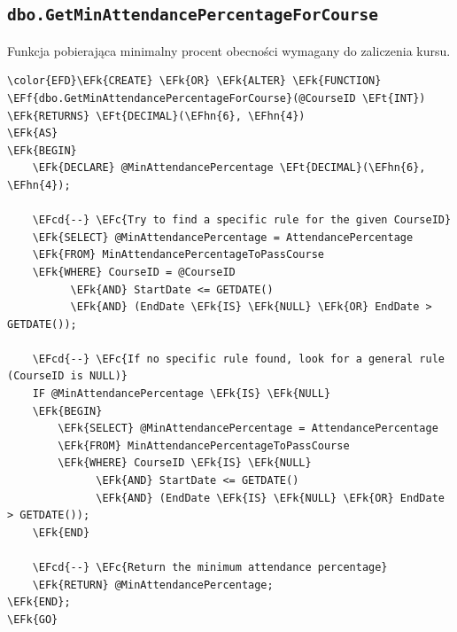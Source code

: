 \documentclass[11pt]{article}
\newcommand{\EFc}[1]{\textcolor{EFc}{\textit{#1}}} %
\newcommand{\EFcd}[1]{\textcolor{EFcd}{\textit{#1}}} %
\newcommand{\EFk}[1]{\textcolor{EFk}{\textbf{#1}}} %
\newcommand{\EFf}[1]{\textcolor{EFf}{#1}} %
\newcommand{\EFt}[1]{\textcolor{EFt}{\textbf{#1}}} %
\newcommand{\EFhn}[1]{\textcolor{EFhn}{#1}} %
\begin{document}
\subsection{\texttt{dbo.GetMinAttendancePercentageForCourse}}
\label{sec:orgd397634}
Funkcja pobierająca minimalny procent obecności wymagany do zaliczenia kursu.
\begin{Code}
\begin{Verbatim}
\color{EFD}\EFk{CREATE} \EFk{OR} \EFk{ALTER} \EFk{FUNCTION} \EFf{dbo.GetMinAttendancePercentageForCourse}(@CourseID \EFt{INT})
\EFk{RETURNS} \EFt{DECIMAL}(\EFhn{6}, \EFhn{4})
\EFk{AS}
\EFk{BEGIN}
    \EFk{DECLARE} @MinAttendancePercentage \EFt{DECIMAL}(\EFhn{6}, \EFhn{4});

    \EFcd{--} \EFc{Try to find a specific rule for the given CourseID}
    \EFk{SELECT} @MinAttendancePercentage = AttendancePercentage
    \EFk{FROM} MinAttendancePercentageToPassCourse
    \EFk{WHERE} CourseID = @CourseID
          \EFk{AND} StartDate <= GETDATE()
          \EFk{AND} (EndDate \EFk{IS} \EFk{NULL} \EFk{OR} EndDate > GETDATE());

    \EFcd{--} \EFc{If no specific rule found, look for a general rule (CourseID is NULL)}
    IF @MinAttendancePercentage \EFk{IS} \EFk{NULL}
    \EFk{BEGIN}
        \EFk{SELECT} @MinAttendancePercentage = AttendancePercentage
        \EFk{FROM} MinAttendancePercentageToPassCourse
        \EFk{WHERE} CourseID \EFk{IS} \EFk{NULL}
              \EFk{AND} StartDate <= GETDATE()
              \EFk{AND} (EndDate \EFk{IS} \EFk{NULL} \EFk{OR} EndDate > GETDATE());
    \EFk{END}

    \EFcd{--} \EFc{Return the minimum attendance percentage}
    \EFk{RETURN} @MinAttendancePercentage;
\EFk{END};
\EFk{GO}
\end{Verbatim}
\end{Code}
\end{document}
